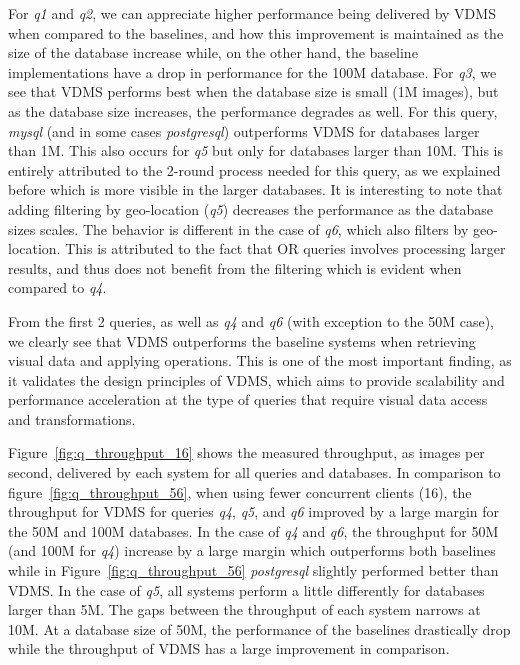 For \textit{q1} and \textit{q2}, we can appreciate higher performance being delivered by
VDMS when compared to the baselines, and how this improvement is maintained
as the size of the database increase while,
on the other hand, the baseline implementations have a drop in performance
for the 100M database.
For \textit{q3}, we see that VDMS performs best when the database size
is small (1M images), but as the database size increases,
the performance degrades as well.
For this query, \textit{mysql} (and in some cases \textit{postgresql}) outperforms VDMS
for databases larger than 1M.
This also occurs for \textit{q5} but only for databases larger than 10M.
This is entirely attributed to the 2-round process needed for this query,
as we explained before which is more visible in the larger databases.
It is interesting to note that adding filtering by geo-location
(\textit{q5}) decreases the performance as the database sizes scales.
The behavior is different in the case of \textit{q6},
which also filters by geo-location.
This is attributed to the fact that OR queries involves processing
larger results, and thus does not benefit from the filtering
which is evident when compared to \textit{q4}.

From the first 2 queries, as well as \textit{q4} and
\textit{q6} (with exception to the 50M case),
we clearly see that VDMS outperforms the baseline systems
when retrieving visual data and applying operations.
This is one of the most important finding, as it validates the design principles
of VDMS, which aims to provide scalability and performance acceleration
at the type of queries that require visual data access and transformations.

Figure~\ref{fig:q_throughput_16} shows the measured throughput,
as images per second, delivered by each system for all queries and databases.
In comparison to figure~\ref{fig:q_throughput_56},
when using fewer concurrent clients (16),
the throughput for VDMS for queries \textit{q4}, \textit{q5}, and \textit{q6}
improved by a large margin for the 50M and 100M databases.
In the case of \textit{q4} and \textit{q6},
the throughput for 50M (and 100M for \textit{q4})
increase by a large margin which outperforms both baselines while in
Figure~\ref{fig:q_throughput_56} \textit{postgresql} slightly performed better than VDMS.
In the case of \textit{q5}, all systems perform a little differently for databases
larger than 5M.
The gaps between the throughput of each system narrows at 10M.
At a database size of 50M, the performance of the baselines drastically drop
while the throughput of VDMS has a large improvement in comparison.

